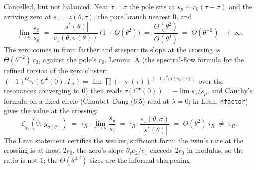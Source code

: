 \documentclass[11pt]{article}
\begin{document}
Cancelled, but not balanced. Near $\tau = \sigma$ the pole sits at $s_p \sim r_0(\tau-\sigma)$
and the arriving zero at $s_z = z(\theta,\tau)$, the pure branch nearest $0$, and
\[
\lim_{\tau\to\sigma}\frac{s_z}{s_p} \;=\; \frac{|s^*(\theta)|}{e_1(\theta,\sigma(\theta))}\,\big(1+O(\theta^2)\big)
\;=\; \frac{\Theta(\theta^2)}{O(\theta^4)} \;=\; \Theta(\theta^{-2}) \;\longrightarrow\; \infty .
\]
The zero comes in from farther and steeper: its slope at the crossing is $\Theta(\theta^{-2})\,r_0$,
against the pole's $r_0$. Lemma~A (the spectral-flow formula for the refined torsion of the
zero cluster: $(-1)^{Q_0}\tau(C^\bullet(0),\Gamma_\vartheta) = \lim\prod(-s_0(\tau))^{(-1)^q m(s_0(\tau))}$
over the resonances converging to $0$) then reads $\tau(C^\bullet(0)) = -\lim s_z/s_p$, and
Cauchy's formula on a fixed circle (Chaubet--Dang (6.5) read at $\lambda = 0$; in Lean,
\texttt{hfactor}) gives the value at the crossing:
\[
\zeta_{\chi_\theta}(0;\, g_{\sigma(\theta)}) \;=\; \tau_R \cdot \lim_{\tau\to\sigma}\frac{s_p}{s_z}
\;=\; \tau_R\cdot\frac{e_1(\theta,\sigma)}{|s^*(\theta)|} \;=\; \Theta(\theta^2)\,\tau_R \;\neq\; \tau_R .
\]
The Lean statement certifies the weaker, sufficient form: the twin's rate at the crossing is at
most $2r_0$, the zero's slope $\partial_\tau e_2/e_1$ exceeds $2r_0$ in modulus, so the ratio is
not $1$; the $\Theta(\theta^{\pm 2})$ sizes are the informal sharpening.
\end{document}

